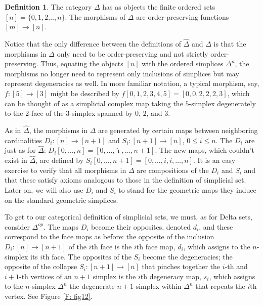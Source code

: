 \documentclass[12pt]{article}
\theoremstyle{plain}
\theoremstyle{definition}
\newtheorem{definition}[theorem]{Definition}
\theoremstyle{remark}
\begin{document}
\begin{definition} The category $\Delta$ has as  objects  the finite ordered sets $[n]=\{0,1,2\ldots, n\}$.  The morphisms of $\Delta$ are order-preserving functions $[m]\to [n]$.
\end{definition}

Notice that the only difference between the definitions of $\widehat \Delta$ and $\Delta$ is that the morphisms in $\Delta$ only need to be order-preserving and not strictly order-preserving. Thus, equating the objects $[n]$ with the ordered simplices $\Delta^n$, the morphisms no longer need to represent only inclusions of simplices but may represent degeneracies as well. In more familiar notation, a typical morphism, say,  $f\colon[5]\to [3]$ might be described by $f[0,1,2,3,4,5]=[0,0,2,2,2,3]$, which can be thought of as a simplicial complex map taking the $5$-simplex degenerately to the $2$-face of the $3$-simplex spanned by $0$, $2$, and $3$. 

As in $\widehat \Delta$, the morphisms in $\Delta$ are generated by certain maps between neighboring cardinalities $D_i\colon[n]\to [n+1]$ and $S_i\colon[n+1]\to [n]$, $0\leq i\leq n$. The $D_i$ are just as for $\widehat \Delta$: $D_i[0,\ldots, n]= [0,\ldots, \hat \imath,\ldots, n+1]$. The new maps, which couldn't exist in $\widehat \Delta$, are defined by $S_i[0,\ldots, n+1]= [0,\ldots, i, i,\ldots, n]$. It is an easy exercise to verify that all morphisms in $\Delta$ are compositions of the $D_i$ and $S_i$ and that these satisfy axioms analogous to those in the definition of simplicial set. Later on, we will also use $D_i$ and $S_i$ to stand for the geometric maps they induce on the  standard geometric simplices. 

To get to our categorical definition of simplicial sets, we must, as for Delta sets, consider $\Delta^{op}$. The maps $D_i$ become their opposites, denoted $d_i$, and these correspond to the face maps as before: the opposite of the inclusion $D_i\colon[n]\to [n+1]$ of the $i$th face is the $i$th face map, $d_i$, which assigns to the $n$-simplex its $i$th face. The opposites of the $S_i$ become the degeneracies; the opposite of the collapse  $S_i\colon[n+1]\to [n]$  that pinches together the  $i$-th and $i+1$-th vertices of an $n+1$ simplex is the $i$th degeneracy map, $s_i$, which assigns to the $n$-simplex $\Delta^n$ the degenerate $n+1$-simplex within $\Delta^{n}$ that repeats the  $i$th vertex. See Figure \ref{F: fig12}.
\end{document}
